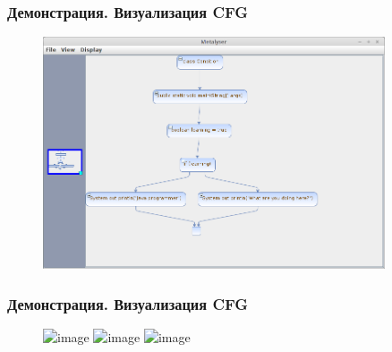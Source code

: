 \documentclass[handout]{beamer}
\begin{document}
\begin{frame}
\frametitle{Демонстрация. Визуализация CFG}

\begin{figure}[h]
    \begin{center}
        \includegraphics[width=0.9\textwidth]{../fig/cfg_test1.png}
    \end{center}
\end{figure}

\end{frame}
\begin{frame}
\frametitle{Демонстрация. Визуализация CFG}

\begin{figure}[b!]
    \begin{center}
        \includegraphics<1>[width=\textwidth]{fig/zoom1.png}
        \includegraphics<2>[width=\textwidth]{fig/zoom2.png}
        \includegraphics<3>[width=\textwidth]{fig/zoom3.png}
    \end{center}
\end{figure}

\end{frame}
\end{document}
